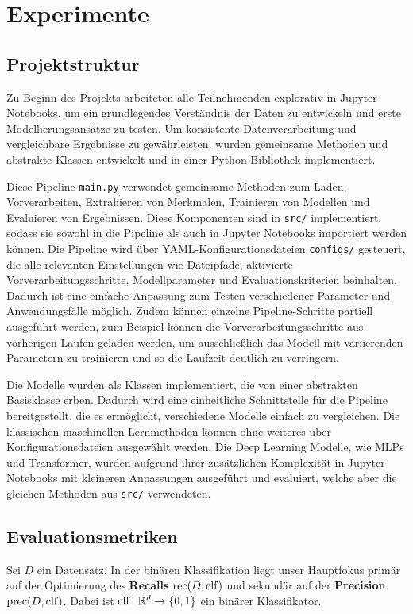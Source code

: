 \section{Experimente}

\subsection{Projektstruktur}
\label{sec:projektstruktur}
Zu Beginn des Projekts arbeiteten alle Teilnehmenden explorativ in Jupyter Notebooks, um ein grundlegendes Verständnis der Daten zu entwickeln und erste Modellierungsansätze zu testen. Um konsistente Datenverarbeitung und vergleichbare Ergebnisse zu gewährleisten, wurden gemeinsame Methoden und abstrakte Klassen entwickelt und in einer Python-Bibliothek implementiert.

Diese Pipeline \texttt{main.py} verwendet gemeinsame Methoden zum Laden, Vorverarbeiten, Extrahieren von Merkmalen, Trainieren von Modellen und Evaluieren von Ergebnissen. Diese Komponenten sind in \texttt{src/} implementiert, sodass sie sowohl in die Pipeline als auch in Jupyter Notebooks importiert werden können. Die Pipeline wird über YAML-Konfigurationsdateien \texttt{configs/} gesteuert, die alle relevanten Einstellungen wie Dateipfade, aktivierte Vorverarbeitungsschritte, Modellparameter und Evaluationskriterien beinhalten. Dadurch ist eine einfache Anpassung zum Testen verschiedener Parameter und Anwendungsfälle möglich. Zudem können einzelne Pipeline-Schritte partiell ausgeführt werden, zum Beispiel können die Vorverarbeitungsschritte aus vorherigen Läufen geladen werden, um ausschließlich das Modell mit variierenden Parametern zu trainieren und so die Laufzeit deutlich zu verringern.

Die Modelle wurden als Klassen implementiert, die von einer abstrakten Basisklasse erben. Dadurch wird eine einheitliche Schnittstelle für die Pipeline bereitgestellt, die es ermöglicht, verschiedene Modelle einfach zu vergleichen. Die klassischen maschinellen Lernmethoden können ohne weiteres über Konfigurationsdateien ausgewählt werden. Die Deep Learning Modelle, wie MLPs und Transformer, wurden aufgrund ihrer zusätzlichen Komplexität in Jupyter Notebooks mit kleineren Anpassungen ausgeführt und evaluiert, welche aber die gleichen Methoden aus \texttt{src/} verwendeten.

\subsection{Evaluationsmetriken}
\label{sec:evaluationsmetriken}
Sei $D$ ein Datensatz. In der binären Klassifikation liegt unser Hauptfokus primär auf der Optimierung des \textbf{Recalls} $\operatorname{rec}(D, \operatorname{clf})$ und sekundär auf der \textbf{Precision} $\operatorname{prec}(D, \operatorname{clf})$. Dabei ist $\operatorname{clf}\colon\mathbb{R}^d\to \{0, 1\}$ ein binärer Klassifikator.\\

